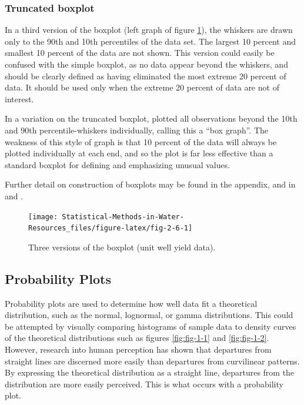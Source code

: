 \documentclass[]{book}
\begin{document}
\hypertarget{truncated-boxplot}{%
\subsubsection{Truncated boxplot}\label{truncated-boxplot}}

In a third version of the boxplot (left graph of figure \ref{fig:fig-2-6}), the whiskers are drawn only to the 90th and 10th percentiles of the data set. The largest 10 percent and smallest 10 percent of the data are not shown. This version could easily be confused with the simple boxplot, as no data appear beyond the whiskers, and should be clearly defined as having eliminated the most extreme 20 percent of data. It should be used only when the extreme 20 percent of data are not of interest.

In a variation on the truncated boxplot, \citet{cleveland_graphical_1985} plotted all observations beyond the 10th and 90th percentile-whiskers individually, calling this a ``box graph''. The weakness of this style of graph is that 10 percent of the data will always be plotted individually at each end, and so the plot is far less effective than a standard boxplot for defining and emphasizing unusual values.

Further detail on construction of boxplots may be found in the appendix, and in \citet{chambers_graphical_1983} and \citet{mcgill_variations_1978}.

\begin{figure}

{\centering \texttt{[image: Statistical-Methods-in-Water-Resources\_files/figure-latex/fig-2-6-1]} 

}

\caption{Three versions of the boxplot (unit well yield data).}\label{fig:fig-2-6}
\end{figure}

\hypertarget{probability-plots}{%
\subsection{Probability Plots}\label{probability-plots}}

Probability plots are used to determine how well data fit a theoretical distribution, such as the normal, lognormal, or gamma distributions. This could be attempted by visually comparing histograms of sample data to density curves of the theoretical distributions such as figures \ref{fig:fig-1-1} and \ref{fig:fig-1-2}. However, research into human perception has shown that departures from straight lines are discerned more easily than departures from curvilinear patterns. By expressing the theoretical distribution as a straight line, departures from the distribution are more easily perceived. This is what occurs with a probability plot.
\end{document}
